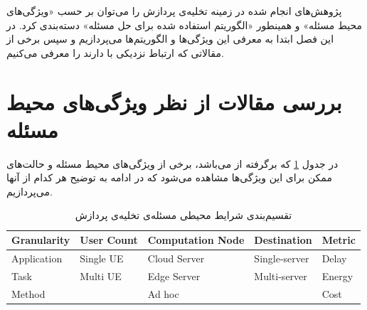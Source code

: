 پژوهش‌های انجام شده در زمینه تخلیه‌ی پردازش را می‌توان بر حسب «ویژگی‌های محیط مسئله» و همینطور «الگوریتم استفاده شده برای حل مسئله» دسته‌بندی کرد. در این فصل ابتدا به معرفی این ویژگی‌ها و الگوریتم‌ها می‌پردازیم و سپس برخی از مقالاتی که ارتباط نزدیکی با \CurrentProject دارند را معرفی می‌کنیم.

\section[ویژگی‌های محیط مسئله]{بررسی مقالات از نظر ویژگی‌های محیط مسئله} 
در جدول \ref{table:mohit} که برگرفته از \cite{wang2019} می‌باشد، برخی از ویژگی‌های محیط مسئله و حالت‌های ممکن برای این ویژگی‌ها مشاهده می‌شود که در ادامه به توضیح هر کدام از آنها می‌پردازیم.
\begin{table}[H]
	\centering
	\begin{latin}

\begin{tabular}{@{}lllll@{}}
	\toprule
	\textbf{Granularity} & \textbf{User Count} & \textbf{Computation Node} & \textbf{Destination} & \textbf{Metric} \\ \midrule
	Application          & Single UE             & Cloud Server      & Single-server        & Delay           \\
	Task                 & Multi UE   & Edge Server       & Multi-server         & Energy          \\
	Method               &             & Ad hoc            &                      & Cost            \\ \bottomrule
\end{tabular}
	\end{latin}
	\caption{تقسیم‌بندی شرایط محیطی مسئله‌ی تخلیه‌ی پردازش}
	\label{table:mohit}
\end{table}

